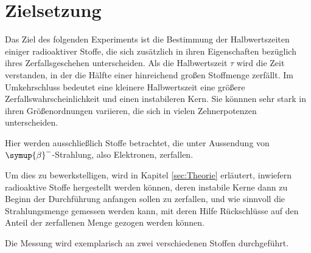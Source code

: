 \section{Zielsetzung}
\label{sec:Zielsetzung}

Das Ziel des folgenden Experiments ist die Bestimmung der Halbwertszeiten einiger radioaktiver Stoffe, die sich zusätzlich 
in ihren Eigenschaften bezüglich ihres Zerfallsgeschehen unterscheiden. 
Als die Halbwertszeit $\tau$ wird die Zeit verstanden, in der die Hälfte einer hinreichend großen Stoffmenge zerfällt. 
Im Umkehrschluss bedeutet eine kleinere Halbwertszeit eine größere Zerfallswahrscheinlichkeit und einen instabileren Kern. 
Sie könnnen sehr stark in ihren Größenordnungen variieren, die sich in vielen Zehnerpotenzen unterscheiden. 

Hier werden ausschließlich Stoffe betrachtet, die unter Aussendung von $\symup{\beta}^-$-Strahlung, also Elektronen, zerfallen. 

Um dies zu bewerkstelligen, wird in Kapitel \ref{sec:Theorie} erläutert, inwiefern radioaktive Stoffe hergestellt werden können, 
deren instabile Kerne dann zu Beginn der Durchführung anfangen sollen zu zerfallen, und wie sinnvoll die Strahlungsmenge gemessen werden kann, mit deren Hilfe Rückschlüsse 
auf den Anteil der zerfallenen Menge gezogen werden können. 

Die Messung wird exemplarisch an zwei verschiedenen Stoffen durchgeführt. 